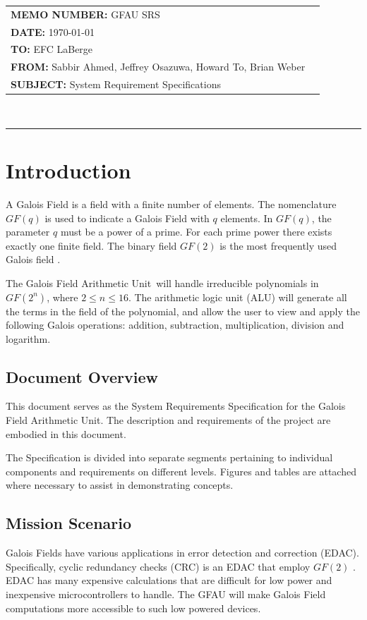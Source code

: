 \documentclass[12pt]{extarticle}
\newcommand{\team}{Galois Field Arithmetic Unit}
\newcommand{\Sabbir}{Sabbir Ahmed}
\newcommand{\Jeffrey}{Jeffrey Osazuwa}
\newcommand{\Howard}{Howard To}
\newcommand{\Brian}{Brian Weber}
\newcommand{\documentinfo}[5]{
    \begin{centering}
        \parbox{2in}{
        \begin{spacing}{1}
            \begin{flushleft}
                \begin{tabular}{l l} #1 \\ #2 \\ #3 \\ #4 \\ #5 \\
                \end{tabular}\\
                \rule{\textwidth}{1pt}
            \end{flushleft}
        \end{spacing} }
    \end{centering} }
\begin{document}
    \documentinfo {\textbf{MEMO NUMBER:} GFAU SRS} {\textbf{DATE:} \today}
    {\textbf{TO: } EFC LaBerge} {\textbf{FROM: }\Sabbir, \Jeffrey, \Howard,
    \Brian} {\textbf{SUBJECT: } System Requirement Specifications}
    \vspace{-0.1in}

    \section{Introduction} A Galois Field is a field with a finite number of
    elements. The nomenclature $GF(q)$ is used to indicate a Galois Field with
    $q$ elements. In $GF(q)$, the parameter $q$ must be a power of a prime. For
    each prime power there exists exactly one finite field. The binary field
    $GF(2)$ is the most frequently used Galois field \cite{wolfdef}.

    The \team~will handle irreducible polynomials in $GF(2^n)$, where $2 \leq
    n \leq 16$. The arithmetic logic unit (ALU) will generate all the terms in
    the field of the polynomial, and allow the user to view and apply the
    following Galois operations: addition, subtraction, multiplication,
    division and logarithm.

        \subsection{Document Overview} This document serves as the System
        Requirements Specification for the Galois Field Arithmetic Unit. The
        description and requirements of the project are embodied in this
        document.

        The Specification is divided into separate segments pertaining to
        individual components and requirements on different levels. Figures and
        tables are attached where necessary to assist in demonstrating
        concepts.

        \subsection{Mission Scenario} Galois Fields have various applications
        in error detection and correction (EDAC). Specifically, cyclic
        redundancy checks (CRC) is an EDAC that employ $GF(2)$ \cite{crc}.
        EDAC has many expensive calculations that are difficult for low power
        and inexpensive microcontrollers to handle. The GFAU will make Galois
        Field computations more accessible to such low powered devices.
        \newpage
\end{document}
